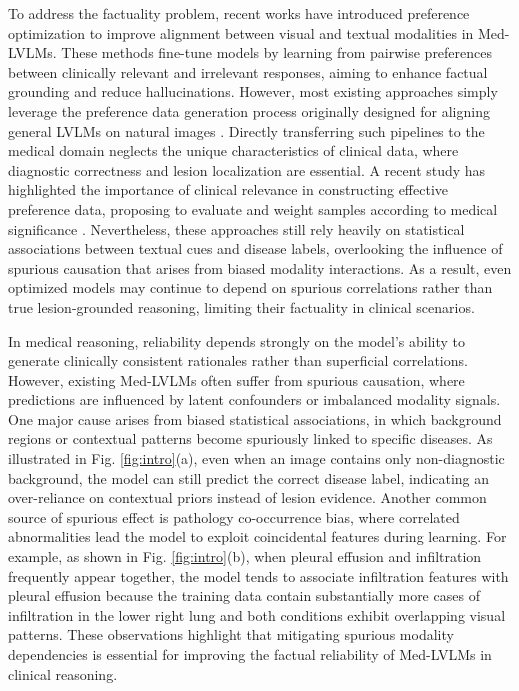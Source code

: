 To address the factuality problem, recent works have introduced preference optimization to improve alignment between visual and textual modalities in Med-LVLMs. These methods fine-tune models by learning from pairwise preferences between clinically relevant and irrelevant responses, aiming to enhance factual grounding and reduce hallucinations. However, most existing approaches simply leverage the preference data generation process originally designed for aligning general LVLMs on natural images \cite{rafailov2023direct, Bai2022RLHF, zhou2024aligning}. Directly transferring such pipelines to the medical domain neglects the unique characteristics of clinical data, where diagnostic correctness and lesion localization are essential. A recent study has highlighted the importance of clinical relevance in constructing effective preference data, proposing to evaluate and weight samples according to medical significance \cite{Zhu2025MMedPO}. Nevertheless, these approaches still rely heavily on statistical associations between textual cues and disease labels, overlooking the influence of spurious causation that arises from biased modality interactions. As a result, even optimized models may continue to depend on spurious correlations rather than true lesion-grounded reasoning, limiting their factuality in clinical scenarios.

In medical reasoning, reliability depends strongly on the model’s ability to generate clinically consistent rationales rather than superficial correlations. However, existing Med-LVLMs often suffer from spurious causation, where predictions are influenced by latent confounders or imbalanced modality signals. One major cause arises from biased statistical associations, in which background regions or contextual patterns become spuriously linked to specific diseases. As illustrated in Fig. \ref{fig:intro}(a), even when an image contains only non-diagnostic background, the model can still predict the correct disease label, indicating an over-reliance on contextual priors instead of lesion evidence. Another common source of spurious effect is pathology co-occurrence bias, where correlated abnormalities lead the model to exploit coincidental features during learning. For example, as shown in Fig. \ref{fig:intro}(b), when pleural effusion and infiltration frequently appear together, the model tends to associate infiltration features with pleural effusion because the training data contain substantially more cases of infiltration in the lower right lung and both conditions exhibit overlapping visual patterns. These observations highlight that mitigating spurious modality dependencies is essential for improving the factual reliability of Med-LVLMs in clinical reasoning.

